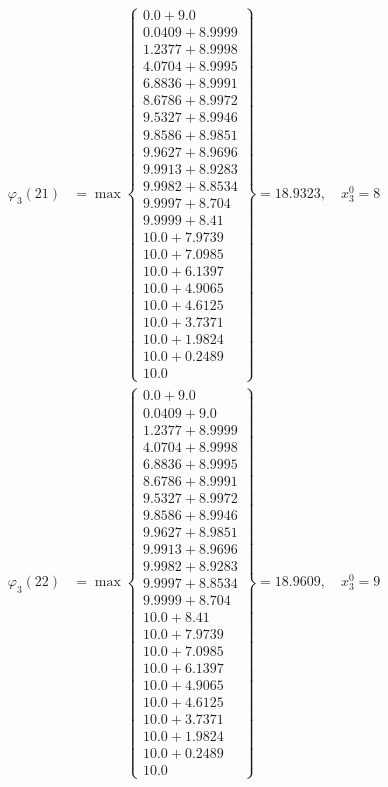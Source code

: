 \documentclass{article}
\begin{document}
\begin{align*}
  
  
  
\varphi_{3}(21) &= \max \left\{ \begin{array}{c}
0.0 + 9.0 \\
 0.0409 + 8.9999 \\
 1.2377 + 8.9998 \\
 4.0704 + 8.9995 \\
 6.8836 + 8.9991 \\
 8.6786 + 8.9972 \\
 9.5327 + 8.9946 \\
 9.8586 + 8.9851 \\
 9.9627 + 8.9696 \\
 9.9913 + 8.9283 \\
 9.9982 + 8.8534 \\
 9.9997 + 8.704 \\
 9.9999 + 8.41 \\
 10.0 + 7.9739 \\
 10.0 + 7.0985 \\
 10.0 + 6.1397 \\
 10.0 + 4.9065 \\
 10.0 + 4.6125 \\
 10.0 + 3.7371 \\
 10.0 + 1.9824 \\
 10.0 + 0.2489 \\
 10.0
\end{array} \right\}=18.9323,\quad x_{3}^0=8\\
  
  
  
  
\varphi_{3}(22) &= \max \left\{ \begin{array}{c}
0.0 + 9.0 \\
 0.0409 + 9.0 \\
 1.2377 + 8.9999 \\
 4.0704 + 8.9998 \\
 6.8836 + 8.9995 \\
 8.6786 + 8.9991 \\
 9.5327 + 8.9972 \\
 9.8586 + 8.9946 \\
 9.9627 + 8.9851 \\
 9.9913 + 8.9696 \\
 9.9982 + 8.9283 \\
 9.9997 + 8.8534 \\
 9.9999 + 8.704 \\
 10.0 + 8.41 \\
 10.0 + 7.9739 \\
 10.0 + 7.0985 \\
 10.0 + 6.1397 \\
 10.0 + 4.9065 \\
 10.0 + 4.6125 \\
 10.0 + 3.7371 \\
 10.0 + 1.9824 \\
 10.0 + 0.2489 \\
 10.0
\end{array} \right\}=18.9609,\quad x_{3}^0=9\\
  

\end{align*}
\end{document}
